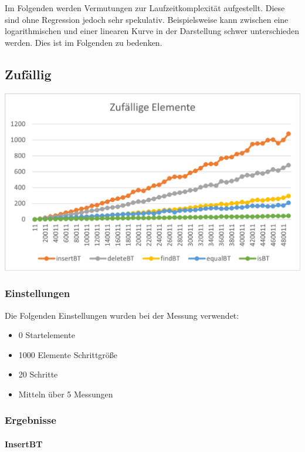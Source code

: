 \documentclass[11pt]{article}
\begin{document}
    Im Folgenden werden Vermutungen zur Laufzeitkomplexität aufgestellt.
    Diese sind ohne Regression jedoch sehr spekulativ.
    Beispielsweise kann zwischen eine logarithmischen und einer linearen Kurve in der Darstellung schwer unterschieden werden. Dies ist im Folgenden zu bedenken.

    \subsection{Zufällig}\label{subsec:zufaellig}

    \begin{center}
        \includegraphics[width=0.9\columnwidth] {ZeitAvg.pdf}
    \end{center}

    \subsubsection{Einstellungen}
    Die Folgenden Einstellungen wurden bei der Messung verwendet:
    \begin{itemize}
        \item 0 Startelemente
        \item 1000 Elemente Schrittgröße
        \item 20 Schritte
        \item Mitteln über 5 Messungen
    \end{itemize}
    
    \subsubsection{Ergebnisse}
    

    
        \paragraph{InsertBT}
        
\end{document}
